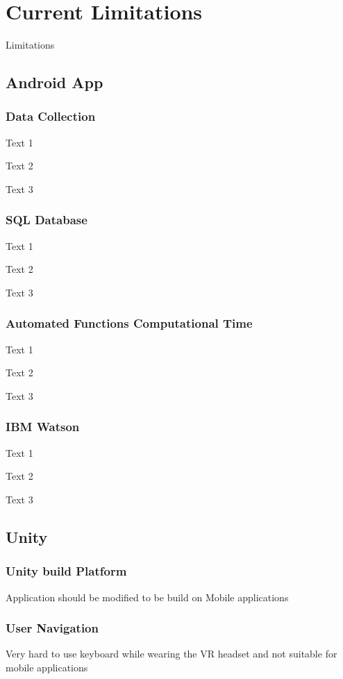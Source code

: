 \chapter{Current Limitations}\label{chap:limit}

Limitations

\section{Android App}\label{sec:l1}

\subsection{Data Collection}\label{sec:l1.1}
Text 1

Text 2

Text 3

\subsection{SQL Database}\label{sec:l1.2}
Text 1

Text 2

Text 3

\subsection{Automated Functions Computational Time}\label{sec:l1.3}
Text 1

Text 2

Text 3

\subsection{IBM Watson}\label{sec:l1.4}
Text 1

Text 2

Text 3


\section{Unity}\label{sec:l2}

\subsection{Unity build Platform}\label{sec:l2.1}

Application should be modified to be build on Mobile applications

\subsection{User Navigation}\label{sec:l2.2}
Very hard to use keyboard while wearing the VR headset and not suitable for mobile applications